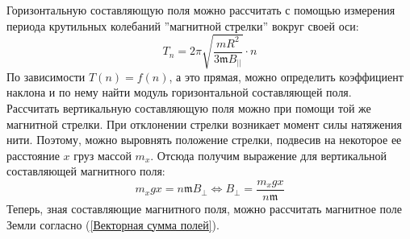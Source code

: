 \documentclass[a4paper, 12pt]{article}
\begin{document}
\begin{enumerate}
\begin{equation}
        \label{Векторная сумма полей}
    \end{equation}
    Горизонтальную составляющую поля можно рассчитать с помощью измерения периода крутильных колебаний ''магнитной стрелки'' вокруг своей оси:
    \begin{equation}
        T_{n} = 2\pi \sqrt{\frac{mR^{2}}{3\mathfrak{m}B_{||}}}\cdot n
        \label{Период крутильных колебаний}
    \end{equation}
    По зависимости $T(n) = f(n)$, а это прямая, можно определить коэффициент наклона и по нему найти модуль горизонтальной составляющей поля.\\
    Рассчитать вертикальную составляющую поля можно при помощи той же магнитной стрелки. При отклонении стрелки возникает момент силы натяжения нити. Поэтому, можно выровнять положение стрелки, подвесив на некоторое ее расстояние $x$ груз массой $m_{x}$. Отсюда получим выражение для вертикальной составляющей магнитного поля:
    \begin{equation}
        m_{x}gx = n\mathfrak{m}B_{\perp} \iff B_{\perp} = \frac{m_{x}gx}{n\mathfrak{m}}
        \label{Вертикальная составляющая}
    \end{equation}
    Теперь, зная составляющие магнитного поля, можно рассчитать магнитное поле Земли согласно (\ref{Векторная сумма полей}).
\end{enumerate}
\end{document}
